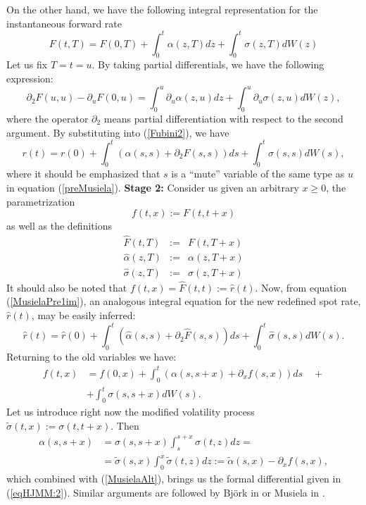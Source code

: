 \begin{demo}
On the other hand, we have the following integral representation for
the instantaneous forward rate 
$$
F(t,T)=F(0,T)+\int_0^t \alpha(z,T) dz+\int_0^t \sigma(z,T) dW(z)
$$
Let us fix $T=t=u$. By taking partial differentials, we have the
following expression:
\begin{equation}
\label{preMusiela}
\partial_2 F(u,u)-\partial_u F(0,u)=\int_0^u \partial_u \alpha(z,u) dz+\int_0^u \partial_u \sigma(z,u) dW(z),
\end{equation}
where the operator $\partial_2$ means partial differentiation with respect
to the second argument. By substituting into (\ref{Fubini2}), we have
\begin{equation}
\label{MusielaPre1im}
r(t)=r(0)+\int_0^t \left(\alpha(s,s)+\partial_2 F(s,s)\right)
ds+\int_0^t \sigma(s,s) dW(s), 
\end{equation}
where it should be emphasized that $s$ is a ``mute'' variable of the
same type as $u$ in equation (\ref{preMusiela}).\newline \noindent 
{\bf Stage 2:} Consider us given an arbitrary $x\geq 0$, the
parametrization 
$$
f(t,x):= F(t,t+x)
$$
as well as the definitions
$$
\begin{array}{rcl}
\hat{F}(t,T) & := &F(t,T+x)\\
\hat{\alpha}(z,T) & := & \alpha(z,T+x)\\
\hat{\sigma}(z,T) & := & \sigma(z,T+x)
\end{array}
$$
It should also be noted that $f(t,x)=\hat{F}(t,t):=\hat{r}(t)$. Now, from
equation (\ref{MusielaPre1im}), an analogous integral equation for the
new redefined spot rate, $\hat{r}(t)$, may be easily inferred: 
\begin{equation}
\label{MusielaPrelim2}
\hat{r}(t)=\hat{r}(0)+\int_0^t \left(\hat{\alpha}(s,s)+\partial_2
  \hat{F}(s,s)\right) ds+\int_0^t \hat{\sigma}(s,s) dW(s).
\end{equation}
Returning to the old variables we have:
\begin{equation}
\label{MusielaAlt}
\begin{split}
f(t,x) & =f(0,x)+\int_0^t \left(\alpha(s,s+x)+\partial_x f(s,x)\right)
ds\quad+\\ 
         & + \int_0^t \sigma(s,s+x) dW(s).
\end{split}
\end{equation}
Let us introduce right now the modified volatility process
$\widetilde\sigma(t,x):=\sigma(t,t+x)$. Then
\begin{equation}
\begin{split}
\alpha(s,s+x) & = \sigma(s,s+x)\int_s^{s+x} \sigma(t,z) dz=\\
                     & = \widetilde\sigma(s,x)\int_0^{x}
                     \widetilde\sigma(t,z) dz :=
                     \widetilde\alpha(s,x)-\partial_x f(s,x),
\end{split}
\end{equation}
which combined with (\ref{MusielaAlt}), brings us the formal
differential given in (\ref{eqHJMM:2}). Similar arguments are followed
by Bj\"ork in \cite{B:1997} or Musiela in \cite{Mu:1993}.
\end{demo}
